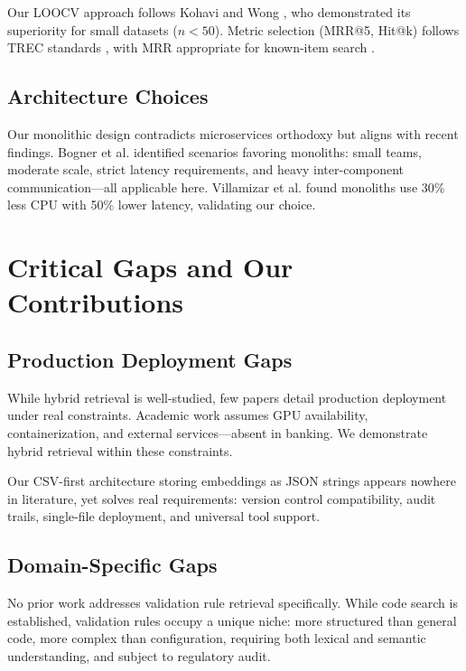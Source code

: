 Our LOOCV approach follows Kohavi \cite{kohavi1995cv} and Wong \cite{wong2015loocv}, who demonstrated its superiority for small datasets ($n < 50$). Metric selection (MRR@5, Hit@k) follows TREC standards \cite{voorhees1999trec}, with MRR appropriate for known-item search \cite{chapelle2009err}.

\subsection{Architecture Choices}

Our monolithic design contradicts microservices orthodoxy \cite{newman2015microservices} but aligns with recent findings. Bogner et al. \cite{bogner2019microservices} identified scenarios favoring monoliths: small teams, moderate scale, strict latency requirements, and heavy inter-component communication—all applicable here. Villamizar et al. \cite{villamizar2015evaluating} found monoliths use 30\% less CPU with 50\% lower latency, validating our choice.

\section{Critical Gaps and Our Contributions}

\subsection{Production Deployment Gaps}

While hybrid retrieval is well-studied, few papers detail production deployment under real constraints. Academic work assumes GPU availability, containerization, and external services—absent in banking. We demonstrate hybrid retrieval within these constraints.

Our CSV-first architecture storing embeddings as JSON strings appears nowhere in literature, yet solves real requirements: version control compatibility, audit trails, single-file deployment, and universal tool support.

\subsection{Domain-Specific Gaps}

No prior work addresses validation rule retrieval specifically. While code search is established, validation rules occupy a unique niche: more structured than general code, more complex than configuration, requiring both lexical and semantic understanding, and subject to regulatory audit.

